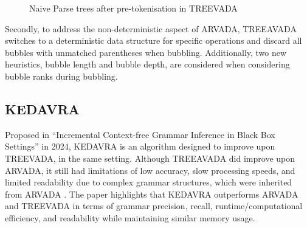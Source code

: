 \begin{figure}[h!]
\caption{Naive Parse trees after pre-tokenisation in TREEVADA \cite{arefinFastDeterministicBlackbox2024}}
\label{fig:pre-tokenised trees}
\end{figure}

Secondly, to address the non-deterministic aspect of ARVADA, TREEAVADA switches to a deterministic data structure for specific operations and discard all bubbles with unmatched parentheses when bubbling. Additionally, two new heuristics, bubble length and bubble depth, are considered when considering bubble ranks during bubbling.

\subsection{KEDAVRA}

Proposed in \enquote{Incremental Context-free Grammar Inference in Black Box
Settings} \cite{liIncrementalContextfreeGrammar2024} in 2024, KEDAVRA is an algorithm designed to improve upon TREEVADA, in the same setting. Although TREEAVADA did improve upon ARVADA, it still had limitations of low accuracy, slow processing speeds, and limited readability due to complex grammar structures, which were inherited from ARVADA \cite{liIncrementalContextfreeGrammar2024,kulkarniLearningHighlyRecursive2021}. 
The paper highlights that KEDAVRA outperforms ARVADA and TREEVADA in terms of grammar precision, recall, runtime/computational efficiency, and readability while maintaining similar memory usage.

